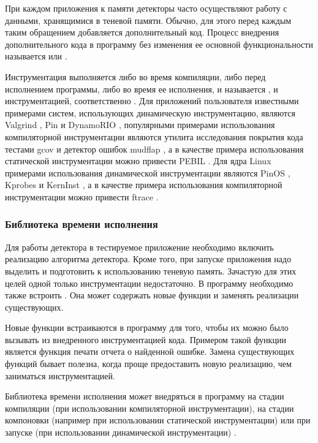 При каждом приложения к памяти детекторы часто осуществляют работу с данными, хранящимися в теневой памяти.
Обычно, для этого перед каждым таким обращением добавляется дополнительный код.
Процесс внедрения дополнительного кода в программу без изменения ее основной функциональности называется  или  \cite{timur}.

Инструментация выполняется либо во время компиляции, либо перед исполнением программы, либо во время ее исполнения, и называется ,  и  инструментацией, соответственно \cite{timur}.
Для приложений пользователя известными примерами систем, использующих динамическую инструментацию, являются Valgrind \cite{valgrind}, Pin \cite{pin} и DynamoRIO \cite{drio},
популярными примерами использования компиляторной инструментации являются утилита исследования покрытия кода тестами gcov \cite{gcov} и детектор ошибок mudflap \cite{mudflap},
а в качестве примера использования статической инструментации можно привести PEBIL \cite{pebil}.
Для ядра Linux примерами использования динамической инструментации являются PinOS \cite{pinos}, Kprobes \cite{Kprobes} и KernInst \cite{kerninst},
а в качестве примера использования компиляторной инструментации можно привести ftrace \cite{ftrace}.


\subsubsection{Библиотека времени исполнения}

Для работы детектора в тестируемое приложение необходимо включить реализацию алгоритма детектора.
Кроме того, при запуске приложения надо выделить и подготовить к использованию теневую память.
Зачастую для этих целей одной только инструментации недостаточно.
В программу необходимо также встроить .
Она может содержать новые функции и заменять реализации существующих.

Новые функции встраиваются в программу для того, чтобы их можно было вызывать из внедренного инструментацией кода.
Примером такой функции является функция печати отчета о найденной ошибке.
Замена существующих функций бывает полезна, когда проще предоставить новую реализацию, чем заниматься инструментацией.

Библиотека времени исполнения может внедряться в программу на стадии компиляции (при использовании компиляторной инструментации), на стадии компоновки (например при использовании статической инструментации) или при запуске (при использовании динамической инструментации) \cite{timur}.

